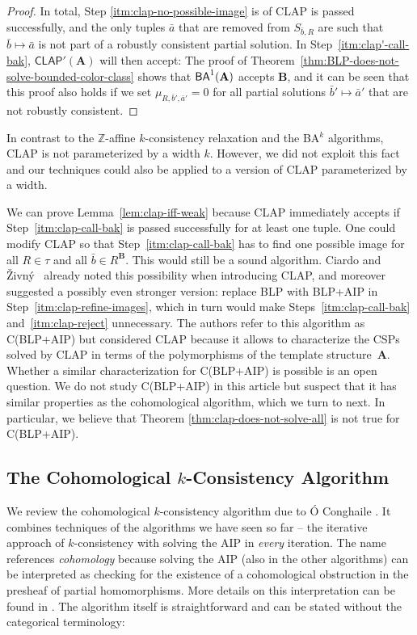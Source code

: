 \documentclass[a4paper,english, thm-restate]{lipics-v2021}
\newcommand{\ZZ}{\mathbb{Z}}
\newcommand{\tup}[1]{\bar{#1}}
\newcommand{\sig}{\tau}
\newcommand{\StructA}{\mathbf{A}}
\newcommand{\StructB}{\mathbf{B}}
\newcommand{\CLAPw}[1]{\mathsf{CLAP'}(#1)}
\begin{document}
\begin{proof}
		In total, Step \ref{itm:clap-no-possible-image} is of CLAP is passed successfully, and the only tuples $\bar{a}$ that are removed from $S_{\bar{b},R}$ are such that $\bar{b} \mapsto \bar{a}$ is not part of a robustly consistent partial solution.
		In Step~\ref{itm:clap'-call-bak}, $\CLAPw{\StructA}$ will then accept:
		The proof of Theorem~\ref{thm:BLP-does-not-solve-bounded-color-class} shows that $\BAk{1}{\StructA}$ accepts $\StructB$, and it can be seen that this proof also holds if we set $\mu_{R,\tup{b}',\tup{a}'} = 0$ for all partial solutions $\bar{b}' \mapsto \bar{a}'$ that are not robustly consistent.
	\end{proof}	
	
	\noindent In contrast to the $\ZZ$-affine $k$-consistency relaxation and the BA$^k$ algorithms,
	CLAP is not parameterized by a width $k$.
	However, we did not exploit this fact and our techniques could also be applied to a version of CLAP parameterized by a width.
	
	We can prove Lemma~\ref{lem:clap-iff-weak} because CLAP immediately accepts
	if Step~\ref{itm:clap-call-bak} is passed successfully for at least one tuple.
	One could modify CLAP so that Step~\ref{itm:clap-call-bak} has to find one possible image for all $R\in\sig$ and all $\tup{b}\in R^\StructB$. This would still be a sound algorithm.
	Ciardo and Živný~\cite{CiardoZivny2023CLAP} already noted this possibility
	when introducing CLAP, and moreover suggested a possibly even stronger version:
	replace BLP with BLP+AIP in Step~\ref{itm:clap-refine-images},
	which in turn would make Steps~\ref{itm:clap-call-bak} and~\ref{itm:clap-reject} unnecessary.
	The authors refer to this algorithm as C(BLP+AIP)
	but considered CLAP because it allows  to characterize
	the CSPs solved by CLAP in terms
	of the polymorphisms of the template structure~$\StructA$.
	Whether a similar characterization for C(BLP+AIP) is possible is an open question.
	We do not study C(BLP+AIP) in this article but suspect that it has similar properties as the cohomological algorithm, which we turn to next.
	In particular, we believe that Theorem \ref{thm:clap-does-not-solve-all} is not true for C(BLP+AIP).
	
	
	
	
	
	
	\subsection{The Cohomological \texorpdfstring{$k$}{k}-Consistency Algorithm}
	\label{app:cohomology}
	We review the cohomological $k$-consistency algorithm due to Ó Conghaile \cite{OConghaile22}.
	It combines techniques of the algorithms we have seen so far --
	the iterative approach of $k$-consistency with solving the AIP
	in \emph{every} iteration.
	The name references \emph{cohomology} because solving the AIP (also in the other algorithms)
	can be interpreted as checking for the existence of a cohomological obstruction in the presheaf of partial homomorphisms. More details on this interpretation can be found in \cite{OConghaile22}. The algorithm itself is straightforward and can be stated without the categorical terminology:
	
\end{document}
